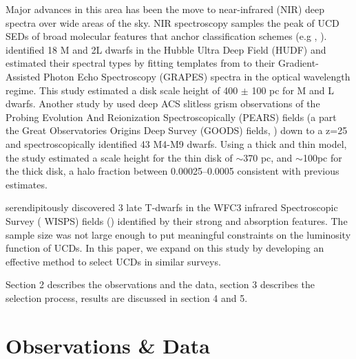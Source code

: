 \documentclass[manuscript]{aastex}
\begin{document}
 Major advances in this area has been the move to near-infrared (NIR) deep spectra over wide areas of the sky. NIR spectroscopy samples the peak of UCD SEDs of broad molecular features that anchor classification schemes (e.g \citealt{2005ARA&A..43..195K}, \citealt{2006ApJ...637.1067B}). \citet{2005ApJ...622..319P} identified 18 M and 2L dwarfs in the Hubble Ultra Deep Field (HUDF) and estimated their spectral types by fitting templates from \citet{Kirkpatrick2000} to their Gradient-Assisted Photon Echo Spectroscopy (GRAPES) spectra in the optical wavelength regime. This study estimated a disk scale height of 400 $\pm$ 100 pc for M and L dwarfs. Another study by \citet{2009ApJ...695.1591P} used deep ACS slitless grism observations of the Probing Evolution And Reionization Spectroscopically (PEARS) fields (a part the Great Observatories Origins Deep Survey (GOODS) fields, \citealt{Giavalisco2004}) down to a z=25 and spectroscopically identified 43 M4-M9 dwarfs. Using a thick and thin model, the study estimated a scale height for the thin disk of  $\sim$370 pc, and $\sim$100pc  for the thick disk, a halo fraction between 0.00025--0.0005 consistent with previous estimates. 

\citealt{2012ApJ...752L..14M} serendipitously discovered 3 late T-dwarfs in the WFC3 infrared Spectroscopic Survey ( WISPS) fields (\citealt{2010ApJ...723..104A}) identified by their strong \meth and \wat absorption features. The sample size was not large enough to put meaningful constraints on the luminosity function of UCDs. In this paper, we expand on this study by developing an effective method to select UCDs in similar surveys.

Section 2 describes the observations and the data, section 3 describes the selection process, results are discussed in section 4 and 5.


\section{Observations \& Data}
\end{document}
